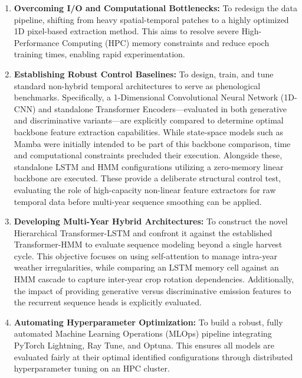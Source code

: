 \begin{enumerate}
    \item[i)] \textbf{Overcoming I/O and Computational Bottlenecks:}
        To redesign the data pipeline, shifting from heavy spatial-temporal patches to a highly optimized 1D pixel-based extraction method.
        This aims to resolve severe High-Performance Computing (HPC) memory constraints and reduce epoch training times, enabling rapid experimentation.

    \item[ii)] \textbf{Establishing Robust Control Baselines:}
        To design, train, and tune standard non-hybrid temporal architectures to serve as phenological benchmarks. 
        Specifically, a 1-Dimensional Convolutional Neural Network (1D-CNN) and standalone Transformer Encoders---evaluated in both
        generative and discriminative variants---are explicitly compared to determine optimal backbone feature extraction capabilities.
        While state-space models such as Mamba were initially intended to be part of this backbone comparison, time and computational constraints precluded their execution. 
        Alongside these, standalone LSTM and HMM configurations utilizing a zero-memory linear backbone are executed.
        These provide a deliberate structural control test, evaluating the role of high-capacity non-linear
        feature extractors for raw temporal data before multi-year sequence smoothing can be applied.

    \item[iii)] \textbf{Developing Multi-Year Hybrid Architectures:}
        To construct the novel Hierarchical \allowbreak Transformer-LSTM and confront it against the established
        Transformer-HMM to evaluate sequence modeling beyond a single harvest cycle.
        This objective focuses on using self-attention to manage intra-year weather irregularities, while comparing an LSTM memory cell against an HMM 
        cascade to capture inter-year crop rotation dependencies.
        Additionally, the impact of providing generative versus discriminative emission features to the recurrent sequence heads is explicitly evaluated.
    
    \item[iv)] \textbf{Automating Hyperparameter Optimization:}
        To build a robust, fully automated Machine Learning Operations (MLOps) pipeline integrating PyTorch Lightning, Ray Tune, and Optuna.
        This ensures all models are evaluated fairly at their optimal identified configurations through distributed hyperparameter tuning on an HPC cluster.
\end{enumerate}


